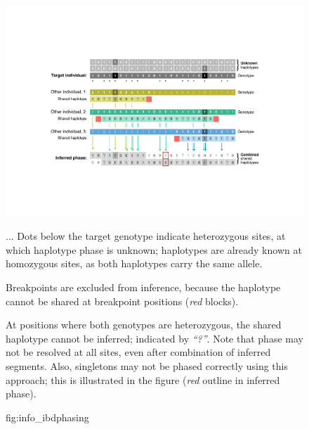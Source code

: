 

\begin{figure}[!tbp]
\centering
\includegraphics[width=\textwidth]{./img/ch3/info_ibdphasing}
{...
Dots below the target genotype indicate heterozygous sites, at which haplotype phase is unknown; haplotypes are already known at homozygous sites, as both haplotypes carry the same allele.

Breakpoints are excluded from inference, because the haplotype cannot be shared at breakpoint positions (\emph{red} blocks).

At positions where both genotypes are heterozygous, the shared haplotype cannot be inferred; indicated by \emph{``?''}.
Note that phase may not be resolved at all sites, even after combination of inferred segments.
Also, singletons may not be phased correctly using this approach; this is illustrated in the figure (\emph{red} outline in inferred phase).}
{fig:info_ibdphasing}
\end{figure}
